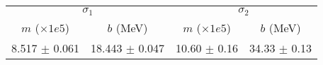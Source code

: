 \begin{tabular}{cc|cc}
\multicolumn{2}{c|}{$\sigma_1$} & \multicolumn{2}{|c}{$\sigma_2$} \\
$m$ ($\times1e5$) & $b$ (MeV) & $m$ ($\times1e5$) & $b$ (MeV) \\
\hline
8.517 $\pm$ 0.061 & 18.443 $\pm$ 0.047 & 10.60 $\pm$ 0.16 & 34.33 $\pm$ 0.13\\
\end{tabular}
